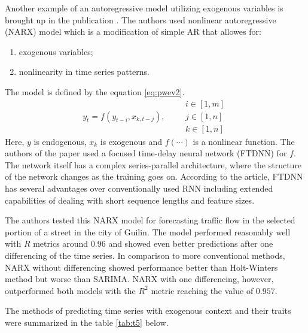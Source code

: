 \documentclass[13pt, a4paper]{article}
\begin{document}
Another example of an autoregressive model utilizing exogenous variables is brought up in the publication \cite{li2022nonlinear}. The authors used nonlinear autoregressive (NARX) model which is a modification of simple AR that allowes for:
\begin{enumerate}
	\item exogenous variables;
	\item nonlinearity in time series patterns.
\end{enumerate}
The model is defined by the equation \ref{eq:pwev2}.
\begin{equation} \label{eq:pwev2}
y_t = f(y_{t-i}, x_{k, t-j}), \qquad \begin{matrix}i \in [1, m] \\ j \in [1, n] \\ k \in [1, n] \end{matrix}
\end{equation}
Here, $y$ is endogenous, $x_k$ is exogenous and $f(\cdots)$ is a nonlinear function. The authors of the paper used a focused time-delay neural network (FTDNN) for $f$. The network itself has a complex series-parallel architecture, where the structure of the network changes as the training goes on. According to the article, FTDNN has several advantages over conventionally used RNN including extended capabilities of dealing with short sequence lengths and feature sizes.

The authors tested this NARX model for forecasting traffic flow in the selected portion of a street in the city of Guilin. The model performed reasonably well with $R$ metrics around $0.96$ and showed even better predictions after one differencing of the time series. In comparison to more conventional methods, NARX without differencing showed performance better than Holt-Winters method but worse than SARIMA. NARX with one differencing, however, outperformed both models with the $R^2$ metric reaching the value of $0.957$.

The methods of predicting time series with exogenous context and their traits were summarized in the table \ref{tab:t5} below.
\end{document}

